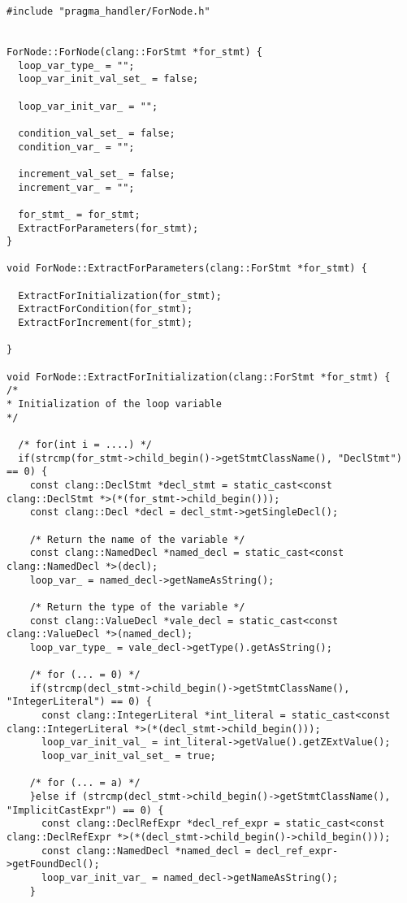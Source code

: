 \documentclass[a4paper,11pt,twoside]{book}
\begin{document}
\begin{lstlisting}[language=CCC, caption=pragma\_handler/ForNode.cpp]
#include "pragma_handler/ForNode.h"


ForNode::ForNode(clang::ForStmt *for_stmt) {
  loop_var_type_ = "";
  loop_var_init_val_set_ = false;

  loop_var_init_var_ = "";

  condition_val_set_ = false;
  condition_var_ = "";

  increment_val_set_ = false;
  increment_var_ = "";

  for_stmt_ = for_stmt;
  ExtractForParameters(for_stmt);
}

void ForNode::ExtractForParameters(clang::ForStmt *for_stmt) {
  
  ExtractForInitialization(for_stmt);
  ExtractForCondition(for_stmt);
  ExtractForIncrement(for_stmt);

}

void ForNode::ExtractForInitialization(clang::ForStmt *for_stmt) {
/*
* Initialization of the loop variable
*/

  /* for(int i = ....) */
  if(strcmp(for_stmt->child_begin()->getStmtClassName(), "DeclStmt") == 0) {
    const clang::DeclStmt *decl_stmt = static_cast<const clang::DeclStmt *>(*(for_stmt->child_begin()));
    const clang::Decl *decl = decl_stmt->getSingleDecl();
    
    /* Return the name of the variable */
    const clang::NamedDecl *named_decl = static_cast<const clang::NamedDecl *>(decl);            
    loop_var_ = named_decl->getNameAsString();
    
    /* Return the type of the variable */  
    const clang::ValueDecl *vale_decl = static_cast<const clang::ValueDecl *>(named_decl);
    loop_var_type_ = vale_decl->getType().getAsString();

    /* for (... = 0) */
    if(strcmp(decl_stmt->child_begin()->getStmtClassName(), "IntegerLiteral") == 0) {      
      const clang::IntegerLiteral *int_literal = static_cast<const clang::IntegerLiteral *>(*(decl_stmt->child_begin())); 
      loop_var_init_val_ = int_literal->getValue().getZExtValue();
      loop_var_init_val_set_ = true;
    
    /* for (... = a) */
    }else if (strcmp(decl_stmt->child_begin()->getStmtClassName(), "ImplicitCastExpr") == 0) {
      const clang::DeclRefExpr *decl_ref_expr = static_cast<const clang::DeclRefExpr *>(*(decl_stmt->child_begin()->child_begin()));
      const clang::NamedDecl *named_decl = decl_ref_expr->getFoundDecl();
      loop_var_init_var_ = named_decl->getNameAsString();
    }


\end{lstlisting}
\end{document}
